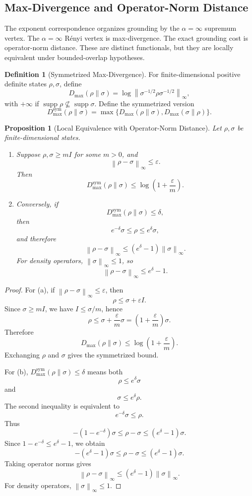 \documentclass[12pt]{article}
\newtheorem{proposition}[theorem]{Proposition}
\theoremstyle{definition}
\newtheorem{definition}[theorem]{Definition}
\DeclareMathOperator{\supp}{supp}
\newcommand{\norm}[1]{\left\lVert#1\right\rVert}
\newcommand{\Dmax}{D_{\max}}
\newcommand{\Dmaxsym}{D_{\max}^{\mathrm{sym}}}
\begin{document}
\subsection{Max-Divergence and Operator-Norm Distance}
\label{subsec:grounding-maxdiv}

The exponent correspondence organizes grounding by the $\alpha=\infty$
supremum vertex.  The $\alpha=\infty$ R\'enyi vertex is max-divergence.  The
exact grounding cost is operator-norm distance.  These are distinct
functionals, but they are locally equivalent under bounded-overlap hypotheses.

\begin{definition}[Symmetrized Max-Divergence]
\label{def:dmax}
For finite-dimensional positive definite states $\rho,\sigma$, define
\[
\Dmax(\rho\|\sigma)
=
\log
\left\|
\sigma^{-1/2}\rho\sigma^{-1/2}
\right\|_\infty,
\]
with $+\infty$ if $\supp\rho\not\subseteq\supp\sigma$.
Define the symmetrized version
\[
\Dmaxsym(\rho\|\sigma)
=
\max\{
\Dmax(\rho\|\sigma),
\Dmax(\sigma\|\rho)
\}.
\]
\end{definition}

\begin{proposition}[Local Equivalence with Operator-Norm Distance]
\label{prop:grounding-local-equivalence}
Let $\rho,\sigma$ be finite-dimensional states.
\begin{enumerate}[label=(\alph*)]
\item Suppose $\rho,\sigma\ge mI$ for some $m>0$, and
\[
\norm{\rho-\sigma}_\infty\le\varepsilon.
\]
Then
\[
\Dmaxsym(\rho\|\sigma)
\le
\log\left(1+\frac{\varepsilon}{m}\right).
\]
\item Conversely, if
\[
\Dmaxsym(\rho\|\sigma)\le\delta,
\]
then
\[
e^{-\delta}\sigma
\le
\rho
\le
e^\delta\sigma,
\]
and therefore
\[
\norm{\rho-\sigma}_\infty
\le
(e^\delta-1)
\norm{\sigma}_\infty.
\]
For density operators, $\norm{\sigma}_\infty\le1$, so
\[
\norm{\rho-\sigma}_\infty
\le
e^\delta-1.
\]
\end{enumerate}
\end{proposition}

\begin{proof}
For (a), if $\norm{\rho-\sigma}_\infty\le\varepsilon$, then
\[
\rho\le\sigma+\varepsilon I.
\]
Since $\sigma\ge mI$, we have $I\le\sigma/m$, hence
\[
\rho
\le
\sigma+\frac{\varepsilon}{m}\sigma
=
\left(1+\frac{\varepsilon}{m}\right)\sigma.
\]
Therefore
\[
\Dmax(\rho\|\sigma)
\le
\log\left(1+\frac{\varepsilon}{m}\right).
\]
Exchanging $\rho$ and $\sigma$ gives the symmetrized bound.

For (b), $\Dmaxsym(\rho\|\sigma)\le\delta$ means both
\[
\rho\le e^\delta\sigma
\]
and
\[
\sigma\le e^\delta\rho.
\]
The second inequality is equivalent to
\[
e^{-\delta}\sigma\le\rho.
\]
Thus
\[
-(1-e^{-\delta})\sigma
\le
\rho-\sigma
\le
(e^\delta-1)\sigma.
\]
Since $1-e^{-\delta}\le e^\delta-1$, we obtain
\[
-(e^\delta-1)\sigma
\le
\rho-\sigma
\le
(e^\delta-1)\sigma.
\]
Taking operator norms gives
\[
\norm{\rho-\sigma}_\infty
\le
(e^\delta-1)
\norm{\sigma}_\infty.
\]
For density operators, $\norm{\sigma}_\infty\le1$.
\end{proof}
\end{document}
